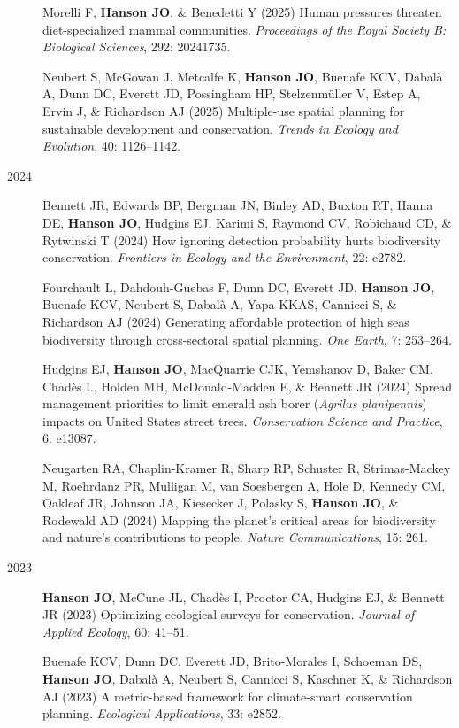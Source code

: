 \documentclass[12pt,a4paper]{article}
\begin{document}
\begin{description}
\item[] Morelli F, \textbf{Hanson JO}, \& Benedetti Y (2025) Human pressures threaten diet-specialized mammal communities. \textit{Proceedings of the Royal Society B: Biological Sciences}, 292: 20241735.

\item[] Neubert S, McGowan J, Metcalfe K, \textbf{Hanson JO}, Buenafe KCV, Dabalà A, Dunn DC, Everett JD, Possingham HP, Stelzenmüller V, Estep A, Ervin J, \& Richardson AJ (2025) Multiple-use spatial planning for sustainable development and conservation. \textit{Trends in Ecology and Evolution}, 40: 1126--1142.

\item[2024] Bennett JR, Edwards BP, Bergman JN, Binley AD, Buxton RT, Hanna DE, \textbf{Hanson JO}, Hudgins EJ, Karimi S, Raymond CV, Robichaud CD, \& Rytwinski T (2024) How ignoring detection probability hurts biodiversity conservation. \textit{Frontiers in Ecology and the Environment}, 22: e2782.

\item[] Fourchault L, Dahdouh-Guebas F, Dunn DC, Everett JD, \textbf{Hanson JO}, Buenafe KCV, Neubert S, Dabalà A, Yapa KKAS, Cannicci S, \& Richardson AJ (2024) Generating affordable protection of high seas biodiversity through cross-sectoral spatial planning. \textit{One Earth}, 7: 253--264.

\item[] Hudgins EJ, \textbf{Hanson JO}, MacQuarrie CJK, Yemshanov D, Baker CM, Chadès I., Holden MH, McDonald-Madden E, \& Bennett JR (2024) Spread management priorities to limit emerald ash borer (\textit{Agrilus planipennis}) impacts on United States street trees. \textit{Conservation Science and Practice}, 6: e13087.

\item[] Neugarten RA, Chaplin-Kramer R, Sharp RP, Schuster R, Strimas-Mackey M, Roehrdanz PR, Mulligan M, van Soesbergen A, Hole D, Kennedy CM, Oakleaf JR, Johnson JA, Kiesecker J, Polasky S, \textbf{Hanson JO}, \& Rodewald AD (2024) Mapping the planet's critical areas for biodiversity and nature's contributions to people. \textit{Nature Communications}, 15: 261.

\item[2023] \textbf{Hanson JO}, McCune JL, Chadès I, Proctor CA, Hudgins EJ, \& Bennett JR (2023) Optimizing ecological surveys for conservation. \textit{Journal of Applied Ecology}, 60: 41--51.

\item[] Buenafe KCV, Dunn DC, Everett JD, Brito-Morales I, Schoeman DS, \textbf{Hanson JO}, Dabalà A, Neubert S, Cannicci S, Kaschner K, \& Richardson AJ (2023) A metric-based framework for climate-smart conservation planning. \textit{Ecological Applications}, 33: e2852.


\end{description}
\end{document}
